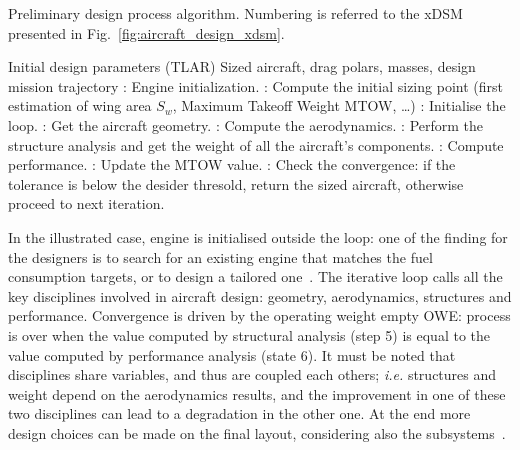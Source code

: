 \begin{algorithm}[!h]
	\caption{Preliminary design process algorithm. Numbering is referred to the xDSM presented in Fig.~\ref{fig:aircraft_design_xdsm}.}
	\label{alg:aircraft_design}
	\begin{algorithmic}
		\REQUIRE Initial design parameters (TLAR)
		\ENSURE Sized aircraft, drag polars, masses, design mission trajectory
		: Engine initialization.
		: Compute the initial sizing point (first estimation of wing area $S_w$, Maximum Takeoff Weight MTOW, \dots)
		: Initialise the loop.
		\REPEAT
		: Get the aircraft geometry.
		: Compute the aerodynamics.
		: Perform the structure analysis and get the weight of all the aircraft's components.
		: Compute performance.
		: Update the MTOW value.
		: Check the convergence: if the tolerance is below the desider thresold, return the sized aircraft, otherwise proceed to next iteration.
	\end{algorithmic}
\end{algorithm}

In the illustrated case, engine is initialised outside the loop: one of the finding for the designers is to search for an existing engine that matches the fuel consumption targets, or to design a tailored one~\cite{bib:mattingly, bib:roux}. 
The iterative loop calls all the key disciplines involved in aircraft design: geometry, aerodynamics, structures and performance. 
Convergence is driven by the operating weight empty OWE: process is over when the value computed by structural analysis (step 5) is equal to the value computed by performance analysis (state 6).  
It must be noted that disciplines share variables, and thus are coupled each others; \textit{i.e.} structures and weight depend on the aerodynamics results, and the improvement in one of these two disciplines can lead to a degradation in the other one.
At the end more design choices can be made on the final layout, considering also the subsystems~\cite{bib:roskam_partIII, bib:roskam_partIV}. 

